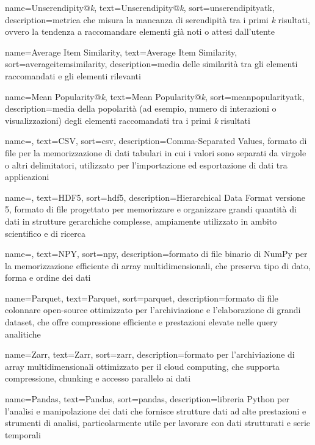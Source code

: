  {
    name=Unserendipity@\emph{k},
    text=Unserendipity@\emph{k},
    sort=unserendipityatk,
    description={metrica che misura la mancanza di serendipità tra i primi \emph{k} risultati, ovvero la tendenza a raccomandare elementi già noti o attesi dall'utente}
}

 {
    name=Average Item Similarity,
    text=Average Item Similarity,
    sort=averageitemsimilarity,
    description={media delle similarità tra gli elementi raccomandati e gli elementi rilevanti}
}

 {
    name=Mean Popularity@\emph{k},
    text=Mean Popularity@\emph{k},
    sort=meanpopularityatk,
    description={media della popolarità (ad esempio, numero di interazioni o visualizzazioni) degli elementi raccomandati tra i primi \emph{k} risultati}
}

 {
    name=,
    text=CSV,
    sort=csv,
    description={Comma-Separated Values, formato di file per la memorizzazione di dati tabulari in cui i valori sono separati da virgole o altri delimitatori, utilizzato per l'importazione ed esportazione di dati tra applicazioni}
}

 {
    name=,
    text=HDF5,
    sort=hdf5,
    description={Hierarchical Data Format versione 5, formato di file progettato per memorizzare e organizzare grandi quantità di dati in strutture gerarchiche complesse, ampiamente utilizzato in ambito scientifico e di ricerca}
}

 {
    name=,
    text=NPY,
    sort=npy,
    description={formato di file binario di NumPy per la memorizzazione efficiente di array multidimensionali, che preserva tipo di dato, forma e ordine dei dati}
}

 {
    name=Parquet,
    text=Parquet,
    sort=parquet,
    description={formato di file colonnare open-source ottimizzato per l'archiviazione e l'elaborazione di grandi dataset, che offre compressione efficiente e prestazioni elevate nelle query analitiche}
}

 {
    name=Zarr,
    text=Zarr,
    sort=zarr,
    description={formato per l'archiviazione di array multidimensionali ottimizzato per il cloud computing, che supporta compressione, chunking e accesso parallelo ai dati}
}

 {
    name=Pandas,
    text=Pandas,
    sort=pandas,
    description={libreria Python per l'analisi e manipolazione dei dati che fornisce strutture dati ad alte prestazioni e strumenti di analisi, particolarmente utile per lavorare con dati strutturati e serie temporali}
}

